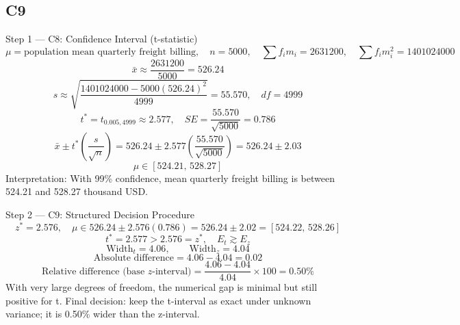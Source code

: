 \begin{ExamProblems}
		\subsection*{C9}
		Step 1 --- C8: Confidence Interval (t-statistic)
		\[
		\mu=\text{population mean quarterly freight billing},\quad n=5000,\quad \sum f_im_i=2631200,\quad \sum f_im_i^2=1401024000
		\]
		\[
		\bar{x}\approx\frac{2631200}{5000}=526.24
		\]
		\[
		s\approx\sqrt{\frac{1401024000-5000(526.24)^2}{4999}}=55.570,\quad df=4999
		\]
		\[
		t^*=t_{0.005,4999}\approx 2.577,\quad SE=\frac{55.570}{\sqrt{5000}}=0.786
		\]
		\[
		\bar{x}\pm t^*\left(\frac{s}{\sqrt{n}}\right)=526.24\pm 2.577\left(\frac{55.570}{\sqrt{5000}}\right)=526.24\pm 2.03
		\]
		\[
		\mu\in[524.21,\,528.27]
		\]
		Interpretation: With 99\% confidence, mean quarterly freight billing is between 524.21 and 528.27 thousand USD.

		Step 2 --- C9: Structured Decision Procedure
		\[
		z^*=2.576,\quad \mu\in 526.24\pm 2.576(0.786)=526.24\pm 2.02=[524.22,\,528.26]
		\]
		\[
		t^*=2.577>2.576=z^*,\quad E_t\gtrsim E_z
		\]
		\[
		\text{Width}_t=4.06,\qquad \text{Width}_z=4.04
		\]
		\[
		\text{Absolute difference}=4.06-4.04=0.02
		\]
		\[
		\text{Relative difference (base }z\text{-interval)}=\frac{4.06-4.04}{4.04}\times 100=0.50\%
		\]
		With very large degrees of freedom, the numerical gap is minimal but still positive for t.
		Final decision: keep the t-interval as exact under unknown variance; it is 0.50\% wider than the z-interval.
	\end{ExamProblems}

